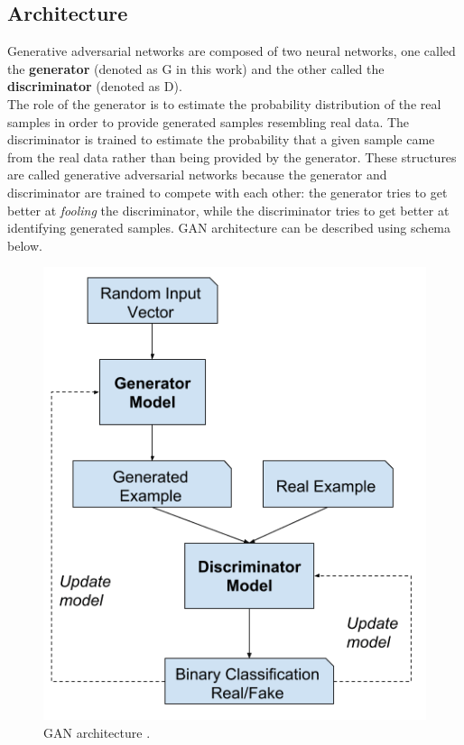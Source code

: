\documentclass[11pt,a4paper,openany]{book}
\begin{document}
\subsection{Architecture}
\noindent Generative adversarial networks are composed of two neural networks, one called the \textbf{generator} (denoted as G in this work) and the other called the \textbf{discriminator} (denoted as D). \\
\noindent The role of the generator is to estimate the probability distribution of the real samples in order to provide generated samples resembling real data. The discriminator is trained to estimate the probability that a given sample came from the real data rather than being provided by the generator.
\noindent These structures are called generative adversarial networks because the generator and discriminator are trained to compete with each other: the generator tries to get better at \textit{fooling} the discriminator, while the discriminator tries to get better at identifying generated samples.  GAN architecture can be described using schema below.
 \begin{figure}[H]
     \centering
     \includegraphics[scale=0.3]{figs/gan_architecture.png}
     \caption{GAN architecture \cite{gan_arch}.}
 \end{figure}
\end{document}
